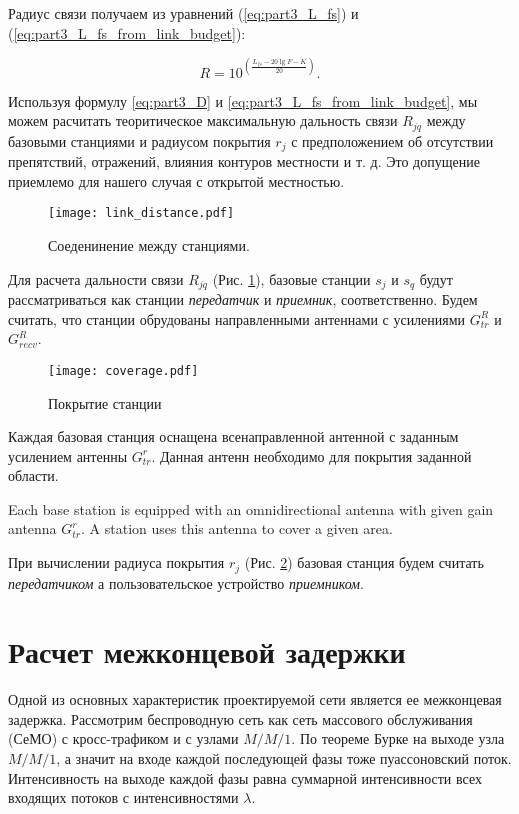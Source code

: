 Радиус связи получаем из уравнений (\cref{eq:part3_L_fs}) и (\cref{eq:part3_L_fs_from_link_budget}):

\begin{equation}
  \label{eq:part3_D}
  R = 10^{\left(\frac{L_{fs} - 20\lg{F} - K}{20}\right)}.
\end{equation}

Используя формулу \cref{eq:part3_D} и \cref{eq:part3_L_fs_from_link_budget}, мы можем расчитать теоритическое максимальную дальность связи $ R_{jq}$ между базовыми станциями и радиусом покрытия $ r_j $ с предположением об отсутствии препятствий, отражений, влияния контуров местности и т. д. Это допущение приемлемо для нашего случая с открытой местностью.

\begin{figure}[h!]
  \centering
   \texttt{[image: link\_distance.pdf]}
\caption{Соеденинение между станциями.}
\label{fig:part3_link_distance}
\end{figure}

Для расчета дальности связи $R_{jq}$ (Рис. \cref{fig:part3_link_distance}), базовые станции $s_j$ и $s_q$ будут рассматриваться как станции \textit{передатчик} и \textit{приемник}, соответственно. Будем считать, что станции обрудованы направленными антеннами с усилениями $G_{tr}^{R}$ и $G_{recv}^{R}$.

\begin{figure}[h!]
  \centering
   \texttt{[image: coverage.pdf]}
\caption{Покрытие станции}
\label{fig:part3_coverage}
\end{figure}

Каждая базовая станция оснащена всенаправленной антенной с заданным усилением антенны $G_ {tr}^{r}$. Данная антенн необходимо для покрытия заданной области.

Each base station is equipped with an omnidirectional antenna with given gain antenna $G_{tr}^{r}$. A station uses this antenna to cover a given area.

При вычислении радиуса покрытия $r_j$ (Рис.  \cref{fig:part3_coverage}) базовая станция будем считать \textit{передатчиком} а пользовательское устройство \textit{приемником}.

\section{Расчет межконцевой задержки}\label{part4_e2e_delay_section}

Одной из основных характеристик проектируемой сети является ее межконцевая задержка. Рассмотрим беспроводную сеть как сеть массового обслуживания (СеМО) с кросс-трафиком и с узлами $M/M/1$. По теореме Бурке \cite{Burke1956} на выходе узла $M/M/1$, а значит на входе каждой последующей фазы тоже пуассоновский поток. Интенсивность на выходе каждой фазы равна суммарной интенсивности всех входящих потоков с интенсивностями $\lambda$.

